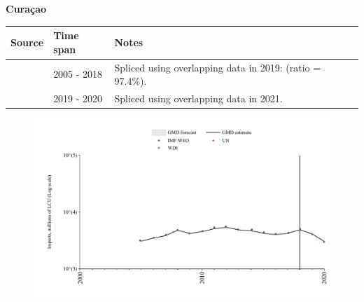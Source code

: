 \documentclass[12pt,a4paper,landscape]{article}
\begin{document}
\begin{adjustbox}{max totalsize={\paperwidth}{\paperheight},center}
\begin{minipage}[t][\textheight][t]{\textwidth}
\vspace*{0.5cm}
{}
\begin{center}
{\Large\bfseries Curaçao}
\end{center}
\vspace{0.5cm}
\begin{table}[H]
\centering
\small
\begin{tabular}{|l|l|l|}
\hline
\textbf{Source} & \textbf{Time span} & \textbf{Notes} \\
\hline
\rowcolor{white}\cite{WDI}& 2005 - 2018 &Spliced using overlapping data in 2019: (ratio = 97.4\%).\\
\rowcolor{lightgray}\cite{UN}& 2019 - 2020 &Spliced using overlapping data in 2021.\\
\hline
\end{tabular}
\end{table}
\begin{figure}[H]
\centering
\includegraphics[width=\textwidth,height=0.6\textheight,keepaspectratio]{graphs/CUW_imports.pdf}
\end{figure}
\end{minipage}
\end{adjustbox}
\end{document}
